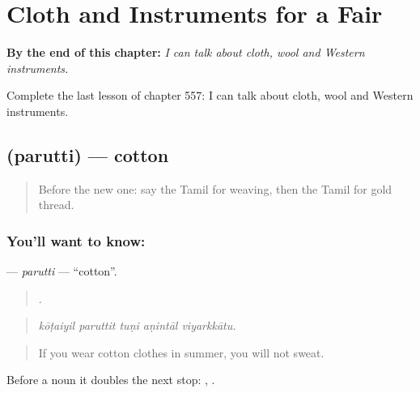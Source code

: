 
\chapter{Cloth and Instruments for a Fair}
\label{ch:ta-cloth-and-instruments-for-a-fair}

\begin{chapteropening}
\textbf{By the end of this chapter:} \emph{I can talk about cloth, wool and Western instruments.}

Complete the last lesson of chapter 557: I can talk about cloth, wool and Western instruments.
\end{chapteropening}

\section[\texorpdfstring{\ta{பருத்தி} (parutti)}{பருத்தி (parutti)}]{ (parutti) — cotton}

\label{lesson:TA-C557-parutti}



\begin{quote}
Before the new one: say the Tamil for weaving, then the Tamil for gold thread.
\end{quote}

\subsection*{You'll want to know: }
\textbf{} — \emph{parutti} — \textquotedblleft{}cotton\textquotedblright{}.

\begin{quote}
    .
\end{quote}

\begin{quote}
\emph{kōṭaiyil paruttit tuṇi aṇintāl viyarkkātu.}
\end{quote}

\begin{quote}
If you wear cotton clothes in summer, you will not sweat.
\end{quote}

Before a noun it doubles the next stop:  ,  .

